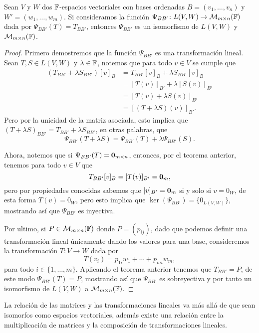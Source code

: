 \begin{teor}\label{teo:isomTrMat}
  Sean $V$ y $W$ dos $\mathbb{F}$-espacios vectoriales con bases ordenadas $B = (v_1,\ldots,v_n)$ y $W' = (w_1,\ldots,w_m)$. Si consideramos la función $\Psi_{BB'}\colon L(V,W) \to \mathcal{M}_{m\times n}(\mathbb{F})$ dada por $\Psi_{BB'}(T) = T_{BB'}$, entonces $\Psi_{BB'}$ es un isomorfismo de $L(V,W)$ y $\mathcal{M}_{m\times n}(\mathbb{F})$.
\end{teor}
\begin{proof}
  Primero demostremos que la función $\Psi_{BB'}$ es una transformación lineal. Sean $T, S \in L(V,W)$ y $\lambda \in \mathbb{F}$, notemos que para todo $v \in V$ se cumple que
  \begin{align*}
    (T_{BB'} + \lambda S_{BB'})[v]_B &= T_{BB'}[v]_B + \lambda S_{BB'} [v]_B \\
      &= [T(v)]_{B'} + \lambda [S(v)]_{B'} \\
      &= [T(v) + \lambda S(v)]_{B'} \\
      &= [ (T + \lambda S)(v)]_{B'}.
  \end{align*}
  Pero por la unicidad de la matriz asociada, esto implica que $(T + \lambda S)_{BB'} = T_{BB'} + \lambda S_{BB'}$, en otras palabras, que
  \[ \Psi_{BB'}(T + \lambda S) = \Psi_{BB'}(T) + \lambda \Psi_{BB'}(S). \]

  Ahora, notemos que si $\Psi_{BB'}(T) = \mathbf{0}_{m\times n}$, entonces, por el teorema anterior, tenemos para todo $v \in V$ que  
    \[ T_{BB'}[v]_B  = [T(v)]_{B'} = \mathbf{0}_m,\]
  pero por propiedades conocidas sabemos que $[v]_{B'} = \mathbf{0}_m$ si y solo si $v = 0_W$, de esta forma $T(v) = 0_W$, pero esto implica que $\ker(\Psi_{BB'}) = \{  0_{L(V,W)} \}$, mostrando así que $\Psi_{BB'}$ es inyectiva.

  Por ultimo, si $P \in \mathcal{M}_{m\times n}(\mathbb{F})$ donde $P = (p_{ij})$, dado que podemos definir una transformación lineal únicamente dando los valores para una base, consideremos la transformación $T\colon V \to W$ dada por
  \[ T(v_i) =  p_{1i}w_1 + \cdots + p_{mi}w_m, \]
  para todo $i \in \{1,\ldots,m\}$. Aplicando el teorema anterior tenemos que $T_{BB'} = P$, de este modo $\Psi_{BB'}(T) = P$, mostrando así que $\Psi_{BB'}$ es sobreyectiva y por tanto un isomorfismo de $L(V,W)$ a $\mathcal{M}_{m\times n}(\mathbb{F})$.
\end{proof}

La relación de las matrices y las transformaciones lineales va más allá de que sean isomorfos como espacios vectoriales, además existe una relación entre la multiplicación de matrices y la composición de transformaciones lineales.

